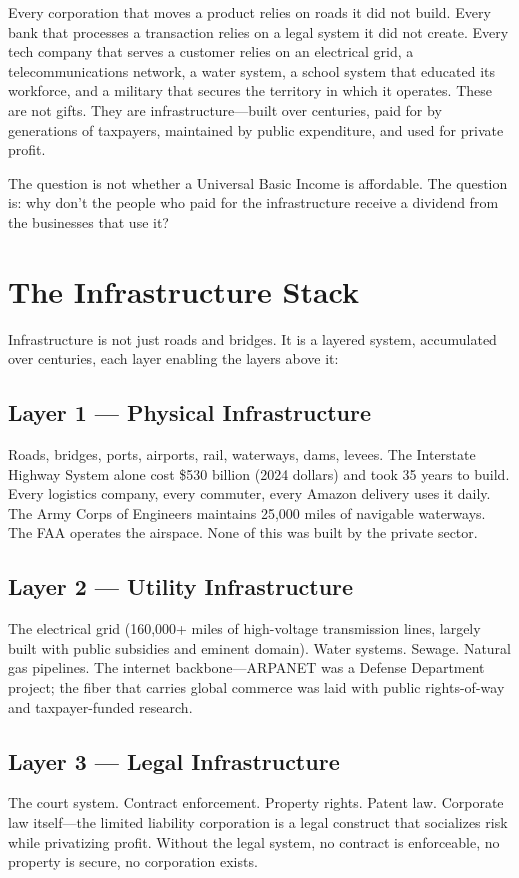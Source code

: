 \documentclass[11pt,letterpaper]{article}
\begin{document}
Every corporation that moves a product relies on roads it did not build. Every bank that processes a transaction relies on a legal system it did not create. Every tech company that serves a customer relies on an electrical grid, a telecommunications network, a water system, a school system that educated its workforce, and a military that secures the territory in which it operates. These are not gifts. They are infrastructure---built over centuries, paid for by generations of taxpayers, maintained by public expenditure, and used for private profit.

The question is not whether a Universal Basic Income is affordable. The question is: why don't the people who paid for the infrastructure receive a dividend from the businesses that use it?

\section{The Infrastructure Stack}

Infrastructure is not just roads and bridges. It is a layered system, accumulated over centuries, each layer enabling the layers above it:

\subsection{Layer 1 --- Physical Infrastructure}
Roads, bridges, ports, airports, rail, waterways, dams, levees. The Interstate Highway System alone cost \$530 billion (2024 dollars) and took 35 years to build. Every logistics company, every commuter, every Amazon delivery uses it daily. The Army Corps of Engineers maintains 25,000 miles of navigable waterways. The FAA operates the airspace. None of this was built by the private sector.

\subsection{Layer 2 --- Utility Infrastructure}
The electrical grid (160,000+ miles of high-voltage transmission lines, largely built with public subsidies and eminent domain). Water systems. Sewage. Natural gas pipelines. The internet backbone---ARPANET was a Defense Department project; the fiber that carries global commerce was laid with public rights-of-way and taxpayer-funded research.

\subsection{Layer 3 --- Legal Infrastructure}
The court system. Contract enforcement. Property rights. Patent law. Corporate law itself---the limited liability corporation is a legal construct that socializes risk while privatizing profit. Without the legal system, no contract is enforceable, no property is secure, no corporation exists.
\end{document}
